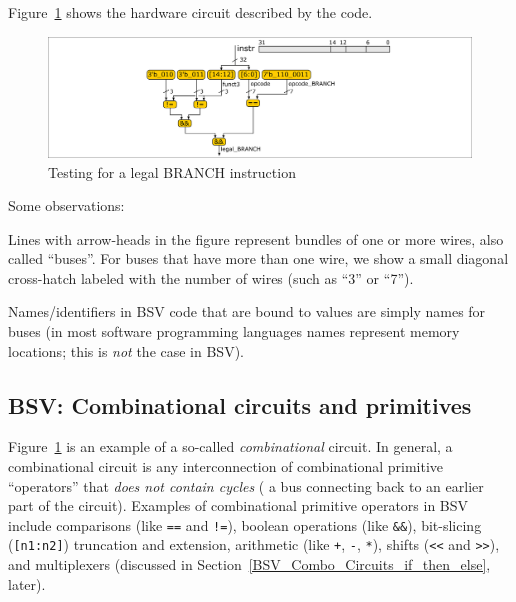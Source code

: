 Figure~\ref{Fig_Combo_Is_Legal_BRANCH} shows the hardware circuit described by the code.
\begin{figure}[htbp]
  \centerline{\includegraphics[width=6in,angle=0]{ch040/Figures/Fig_Combo_Is_Legal_BRANCH}}
  \caption{\label{Fig_Combo_Is_Legal_BRANCH}Testing for a legal BRANCH instruction}
\end{figure}
Some observations:
\begin{tightlist}

 \item Lines with arrow-heads in the figure represent bundles of one
   or more wires, also called ``buses''.  For buses that have more
   than one wire, we show a small diagonal cross-hatch labeled with
   the number of wires (such as ``3'' or ``7'').

 \item Names/identifiers in BSV code that are bound to values are
   simply names for buses (in most software programming languages
   names represent memory locations; this is \emph{not} the case in
   BSV).

\end{tightlist}


\subsection{BSV: Combinational circuits and primitives}


Figure~\ref{Fig_Combo_Is_Legal_BRANCH} is an example of a so-called
\emph{combinational} circuit.  In general, a combinational circuit is
any interconnection of combinational primitive ``operators'' that
\emph{does not contain cycles} ({\ie} a bus connecting back to an
earlier part of the circuit).  Examples of combinational primitive
operators in BSV include comparisons (like \verb|==| and \verb|!=|),
boolean operations (like \verb|&&|), bit-slicing (\verb|[n1:n2]|)
truncation and extension, arithmetic (like \verb|+|, \verb|-|,
\verb|*|), shifts (\verb|<<| and \verb|>>|), and multiplexers
(discussed in Section~\ref{BSV_Combo_Circuits_if_then_else}, later).

